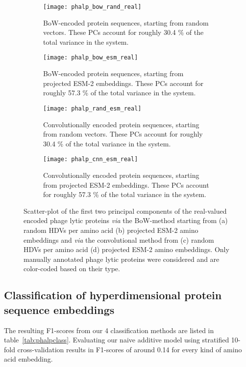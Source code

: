 \begin{figure}[h!]
    \centering
    \begin{subfigure}[b]{0.48\textwidth}
        \texttt{[image: phalp\_bow\_rand\_real]}
        \caption{BoW-encoded protein sequences, starting from random vectors. These PCs account for roughly 30.4 \% of the total variance in the system.}
    \label{fig:phalpbowrandr}
    \end{subfigure}
        \hfill
    \begin{subfigure}[b]{0.48\textwidth}
        \texttt{[image: phalp\_bow\_esm\_real]}
        \caption{BoW-encoded protein sequences, starting from projected ESM-2 embeddings. These PCs account for roughly 57.3 \% of the total variance in the system.}
    \label{fig:phalpbowesmr}
    \end{subfigure}
    \begin{subfigure}[b]{0.48\textwidth}
        \texttt{[image: phalp\_rand\_esm\_real]}
        \caption{Convolutionally encoded protein sequences, starting from random vectors. These PCs account for roughly 30.4 \% of the total variance in the system.}
    \label{fig:phalpcnnrandr}
    \end{subfigure}
    \hfill
    \begin{subfigure}[b]{0.48\textwidth}
        \texttt{[image: phalp\_cnn\_esm\_real]}
        \caption{Convolutionally encoded protein sequences, starting from projected ESM-2 embeddings. These PCs account for roughly 57.3 \% of the total variance in the system.}
    \label{fig:phalpcnnesmr}
    \end{subfigure}
    \caption{Scatter-plot of the first two principal components of the real-valued encoded phage lytic proteins \textit{via} the BoW-method starting from (a) random HDVs per amino acid (b) projected ESM-2 amino embeddings and \textit{via} the convolutional method from (c) random HDVs per amino acid (d) projected ESM-2 amino embeddings. Only manually annotated phage lytic proteins were considered and are color-coded based on their type.}\label{fig:phalp_embr}
\end{figure}

\subsection*{Classification of hyperdimensional protein sequence embeddings}
The resulting F1-scores from our 4 classification methods are listed in table~\ref{tab:phalpclass}. Evaluating our naive additive model using stratified 10-fold cross-validation results in F1-scores of around 0.14 for every kind of amino acid embedding.

